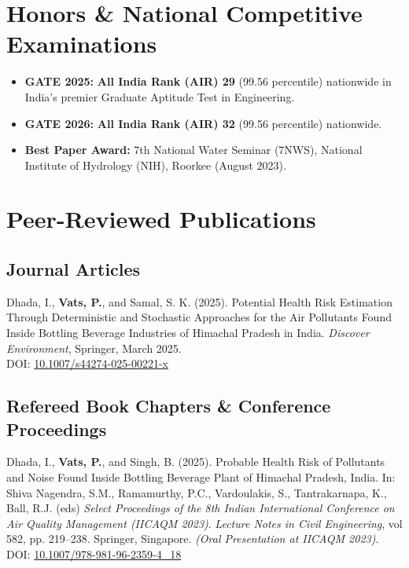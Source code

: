 \documentclass[10pt,a4paper]{article}
\begin{document}
\section*{Honors \& National Competitive Examinations}
\begin{itemize}
    \item \textbf{GATE 2025:} \textbf{All India Rank (AIR) 29} (99.56 percentile) nationwide in India's premier Graduate Aptitude Test in Engineering.
    \item \textbf{GATE 2026:} \textbf{All India Rank (AIR) 32} (99.56 percentile) nationwide.
    \item \textbf{Best Paper Award:} 7th National Water Seminar (7NWS), National Institute of Hydrology (NIH), Roorkee (August 2023).
\end{itemize}

\section*{Peer-Reviewed Publications}

\subsection*{Journal Articles}
\begin{enumerate}[leftmargin=18pt, label={[\arabic*]}]
    \item Dhada, I., \textbf{Vats, P.}, and Samal, S. K. (2025). Potential Health Risk Estimation Through Deterministic and Stochastic Approaches for the Air Pollutants Found Inside Bottling Beverage Industries of Himachal Pradesh in India. \textit{Discover Environment}, Springer, March 2025.\\
    DOI: \href{https://doi.org/10.1007/s44274-025-00221-x}{10.1007/s44274-025-00221-x}
\end{enumerate}

\subsection*{Refereed Book Chapters \& Conference Proceedings}
\begin{enumerate}[leftmargin=18pt, label={[\arabic*]}, resume]
    \item Dhada, I., \textbf{Vats, P.}, and Singh, B. (2025). Probable Health Risk of Pollutants and Noise Found Inside Bottling Beverage Plant of Himachal Pradesh, India. In: Shiva Nagendra, S.M., Ramamurthy, P.C., Vardoulakis, S., Tantrakarnapa, K., Ball, R.J. (eds) \textit{Select Proceedings of the 8th Indian International Conference on Air Quality Management (IICAQM 2023)}. \textit{Lecture Notes in Civil Engineering}, vol 582, pp. 219--238. Springer, Singapore. \textit{(Oral Presentation at IICAQM 2023)}.\\
    DOI: \href{https://doi.org/10.1007/978-981-96-2359-4_18}{10.1007/978-981-96-2359-4\_18}
\end{enumerate}
\end{document}
